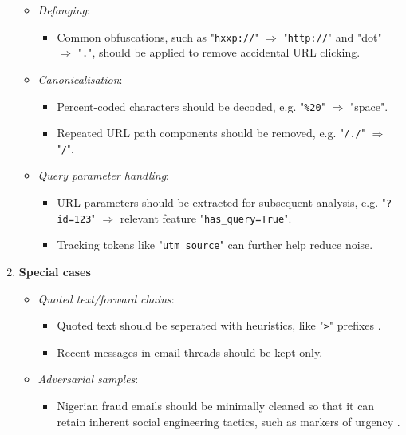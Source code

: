 \begin{enumerate}
  \begin{itemize}
    \item \textit{Defanging}:
    \begin{itemize}
      \item Common obfuscations, such as "\texttt{hxxp://}" $\Rightarrow$ "\texttt{http://}" and "dot" $\Rightarrow$ "\texttt{.}", should be applied to remove accidental URL clicking.
    \end{itemize}
    \item \textit{Canonicalisation}:
    \begin{itemize}
      \item Percent-coded characters should be decoded, e.g. "\texttt{\%20}" $\Rightarrow$ "space".
      \item Repeated URL path components should be removed, e.g. "\texttt{/./}" $\Rightarrow$ "\texttt{/}".
    \end{itemize}
    \item \textit{Query parameter handling}:
    \begin{itemize}
      \item URL parameters should be extracted for subsequent analysis, e.g. "\texttt{?id=123}" $\Rightarrow$ relevant feature "\texttt{has\_query=True}".
      \item Tracking tokens like "\texttt{utm\_source}" can further help reduce noise.
    \end{itemize}
  \end{itemize}
\item \textbf{Special cases}
\begin{itemize}
  \item \textit{Quoted text/forward chains}:
  \begin{itemize}
    \item Quoted text should be seperated with heuristics, like "\texttt{>}" prefixes \citep{klimt2004enron}.
    \item Recent messages in email threads should be kept only.
  \end{itemize}
  \item \textit{Adversarial samples}:
  \begin{itemize}
    \item Nigerian fraud emails should be minimally cleaned so that it can retain inherent social engineering tactics, such as markers of urgency \citep{champa2024phishing}.
  \end{itemize}
\end{itemize}
\end{enumerate}
